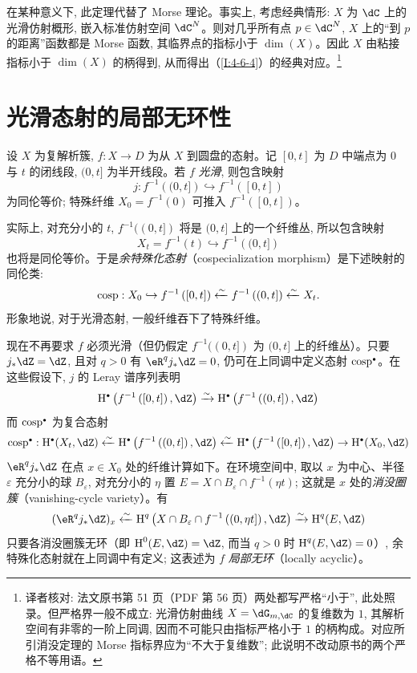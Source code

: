 在某种意义下, 此定理代替了 Morse 理论。事实上, 考虑经典情形: $X$ 为 $\dC$ 上的光滑仿射概形, 嵌入标准仿射空间 $\dC^N$。则对几乎所有点 $p\in\dC^N$, $X$ 上的“到 $p$ 的距离”函数都是 Morse 函数, 其临界点的指标小于 $\dim(X)$。因此 $X$ 由粘接指标小于 $\dim(X)$ 的柄得到, 从而得出（\ref{I:4-6-4}）的经典对应。\footnote{译者核对: 法文原书第 51 页（PDF 第 56 页）两处都写严格“小于”, 此处照录。但严格界一般不成立: 光滑仿射曲线 $X=\dG_{m,\dC}$ 的复维数为 $1$, 其解析空间有非零的一阶上同调, 因而不可能只由指标严格小于 $1$ 的柄构成。对应所引消没定理的 Morse 指标界应为“不大于复维数”; 此说明不改动原书的两个严格不等用语。}

\section{光滑态射的局部无环性}\label{I:5}

设 $X$ 为复解析簇, $f:X\to D$ 为从 $X$ 到圆盘的态射。记 $[0,t]$ 为 $D$ 中端点为 $0$ 与 $t$ 的闭线段, $(0,t]$ 为半开线段。若 $f$ \emph{光滑}, 则包含映射
\[
  j : f^{-1}\left((0,t]\right) \hookrightarrow f^{-1}\left([0,t]\right)
\]
为同伦等价; 特殊纤维 $X_0=f^{-1}(0)$ 可推入 $f^{-1}([0,t])$。

实际上, 对充分小的 $t$, $f^{-1}((0,t])$ 将是 $(0,t]$ 上的一个纤维丛, 所以包含映射
\[
  X_t = f^{-1}(t) \hookrightarrow f^{-1}\left((0,t]\right)
\]
也将是同伦等价。于是\emph{余特殊化态射}（cospecialization morphism）是下述映射的同伦类:
\[
  \operatorname{cosp} : X_0 \hookrightarrow f^{-1}\left([0,t]\right) \xleftarrow\sim f^{-1}\left((0,t]\right) \xleftarrow\sim X_t \text{.}
\]
形象地说, 对于光滑态射, 一般纤维吞下了特殊纤维。

现在不再要求 $f$ 必须光滑（但仍假定 $f^{-1}((0,t])$ 为 $(0,t]$ 上的纤维丛）。只要 $j_*\dZ=\dZ$, 且对 $q>0$ 有 $\eR^qj_*\dZ=0$, 仍可在上同调中定义态射 $\cosp^\bullet$。在这些假设下, $j$ 的 Leray 谱序列表明
\[
  \h^\bullet\left(f^{-1}\left([0,t]\right),\dZ\right) \iso \h^\bullet\left(f^{-1}\left((0,t]\right),\dZ\right)
\]
而 $\cosp^\bullet$ 为复合态射
\[
  \cosp^\bullet : \h^\bullet(X_t,\dZ)
    \xleftarrow\sim \h^\bullet\left(f^{-1}\left((0,t]\right),\dZ\right)
    \xleftarrow\sim \h^\bullet\left(f^{-1}\left([0,t]\right),\dZ\right)
    \to \h^\bullet(X_0,\dZ)
\]
$\eR^qj_*\dZ$ 在点 $x\in X_0$ 处的纤维计算如下。在环境空间中, 取以 $x$ 为中心、半径 $\varepsilon$ 充分小的球 $B_\varepsilon$, 对充分小的 $\eta$ 置 $E=X\cap B_\varepsilon\cap f^{-1}(\eta t)$; 这就是 $x$ 处的\emph{消没圈簇}（vanishing-cycle variety）。有
\[
  (\eR^q j_* \dZ)_x \xleftarrow\sim \h^q\left(X\cap B_\varepsilon\cap f^{-1}\left((0,\eta t]\right),\dZ\right) \xrightarrow\sim \h^q(E,\dZ)
\]
只要各消没圈簇无环（即 $\h^0(E,\dZ)=\dZ$, 而当 $q>0$ 时 $\h^q(E,\dZ)=0$）, 余特殊化态射就在上同调中有定义; 这表述为 $f$ \emph{局部无环}（locally acyclic）。

